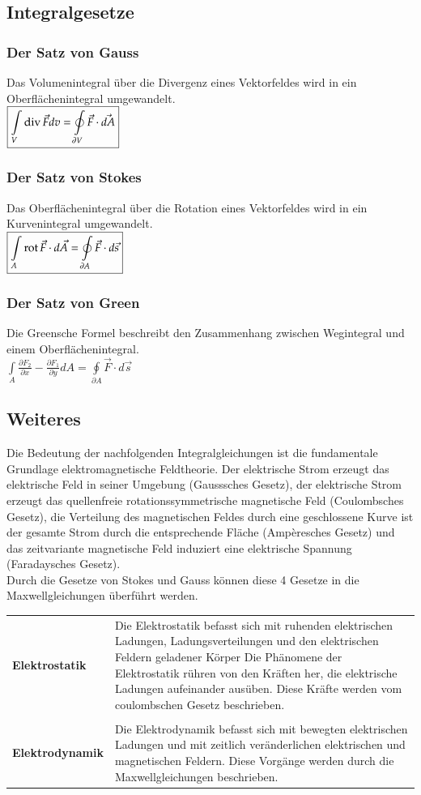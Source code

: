\subsection{Integralgesetze}
\subsubsection{Der Satz von Gauss}
Das Volumenintegral über die Divergenz eines Vektorfeldes wird in ein Oberflächenintegral umgewandelt.\\
$\boxed{\int\limits_V \operatorname{div} \vec F dv = \oint\limits_{\partial V} \vec F \cdot \vec{dA}}$
\subsubsection{Der Satz von Stokes}
Das Oberflächenintegral über die Rotation eines Vektorfeldes wird in ein Kurvenintegral umgewandelt. \\
$\boxed{\int\limits_A \operatorname{rot} \vec{F}\cdot d\vec{A}  = \oint\limits_{\partial A}\vec{F}\cdot d\vec{s}}$
\subsubsection{Der Satz von Green}
Die Greensche Formel beschreibt den Zusammenhang zwischen Wegintegral und einem Oberflächenintegral.\\
$\boxed{\int\limits_A \frac{\partial F_2}{\partial x} - \frac{\partial F_1}{\partial y} dA = \oint\limits_{\partial A}\vec{F}\cdot d\vec{s}}$
\subsection{Weiteres}
Die Bedeutung der nachfolgenden Integralgleichungen ist die fundamentale Grundlage elektromagnetische Feldtheorie. Der elektrische Strom erzeugt das elektrische Feld in seiner Umgebung (Gausssches Gesetz), der elektrische Strom erzeugt das quellenfreie rotationssymmetrische magnetische Feld (Coulombsches Gesetz), die Verteilung des magnetischen Feldes durch eine geschlossene Kurve ist der gesamte Strom durch die entsprechende Fläche (Ampèresches Gesetz) und das zeitvariante magnetische Feld induziert eine elektrische Spannung (Faradaysches Gesetz).\\
Durch die Gesetze von Stokes und Gauss können diese 4 Gesetze in die Maxwellgleichungen überführt werden. 
\vspace{-0.8cm}
\begin{longtable}{p{} p{}}
	\textbf{Elektrostatik} & Die Elektrostatik befasst sich mit ruhenden elektrischen Ladungen, Ladungsverteilungen und den elektrischen Feldern geladener Körper
	Die Phänomene der Elektrostatik rühren von den Kräften her, die elektrische Ladungen aufeinander ausüben. Diese Kräfte werden vom coulombschen Gesetz beschrieben.\\
    &\\
	\textbf{Elektrodynamik} & Die Elektrodynamik befasst sich mit bewegten elektrischen Ladungen und mit zeitlich veränderlichen elektrischen und magnetischen Feldern. Diese Vorgänge werden durch die Maxwellgleichungen beschrieben. \\
\end{longtable}
